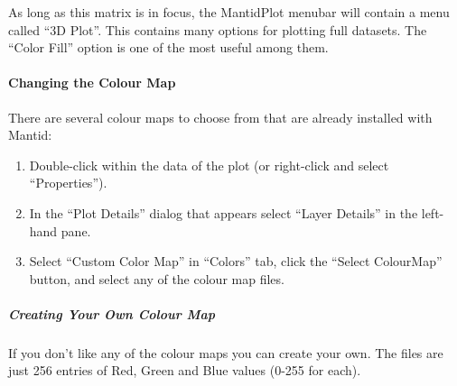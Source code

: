 \documentclass[letterpaper,10pt,english,openany]{sphinxmanual}
\begin{document}
As long as this matrix is in focus, the MantidPlot menubar will contain
a menu called “3D Plot”. This contains many options for plotting full
datasets. The “Color Fill” option is one of the most useful among them.


\paragraph{Changing the Colour Map}
\label{\detokenize{mantid_basic_course/loading_and_displaying_data/04_displaying_2D_data:changing-the-colour-map}}
There are several colour maps to choose from that are already installed
with Mantid:
\begin{enumerate}
\def\theenumi{\arabic{enumi}}
\def\labelenumi{\theenumi .}
\makeatletter\def\p@enumii{\p@enumi \theenumi .}\makeatother
\item {} 
Double-click within the data of the plot (or right-click and select
“Properties”).

\item {} 
In the “Plot Details” dialog that appears select “Layer Details” in
the left-hand pane.

\item {} 
Select “Custom Color Map” in “Colors” tab, click the “Select
ColourMap” button, and select any of the colour map files.

\end{enumerate}


\subparagraph{Creating Your Own Colour Map}
\label{\detokenize{mantid_basic_course/loading_and_displaying_data/04_displaying_2D_data:creating-your-own-colour-map}}
If you don’t like any of the colour maps you can create your own. The
files are just 256 entries of Red, Green and Blue values (0-255 for
each).
\end{document}
